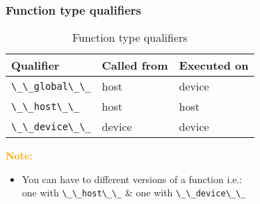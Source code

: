 \begin{frame}
   \frametitle{Function type qualifiers}
      \begin{table}[H]
	 \begin{center}      
  	    \begin{tabular}{l|l|l}
            Qualifier                                    & Called from  & Executed on   \\
               \hline		
	   \lstinline[style=MyCudaStyle]|\_\_global\_\_| & host         & device\\
 	   \lstinline[style=MyCudaStyle]|\_\_host\_\_|   & host         & host \\
           \lstinline[style=MyCudaStyle]|\_\_device\_\_| & device       & device \\ 
               \hline
            \end{tabular}
         \end{center}
	 \caption{Function type qualifiers}
      \end{table}
      \textbf{\textcolor{orange}{Note:}}\\  	
      \begin{itemize}
         \item You can have to different versions of a function i.e.:\\
	       one with \lstinline[style=MyCudaStyle]|\_\_host\_\_|  \& one with \lstinline[style=MyCudaStyle]|\_\_device\_\_|
      \end{itemize}		      
\end{frame}

